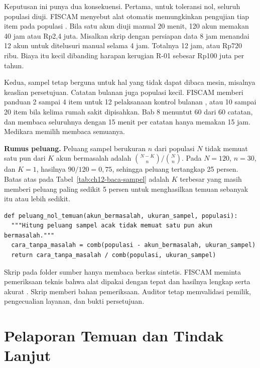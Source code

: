 Keputusan ini punya dua konsekuensi. Pertama, untuk toleransi nol, seluruh populasi diuji. FISCAM
menyebut alat otomatis memungkinkan pengujian tiap item pada populasi \cite{c12-fiscam2026}. Bila
satu akun diuji manual 20 menit, 120 akun memakan 40 jam atau Rp2,4 juta. Misalkan skrip dengan
persiapan data 8 jam menandai 12 akun untuk ditelusuri manual selama 4 jam. Totalnya 12 jam, atau
Rp720 ribu. Biaya itu kecil dibanding harapan kerugian R-01 sebesar Rp100 juta per tahun.

Kedua, sampel tetap berguna untuk hal yang tidak dapat dibaca mesin, misalnya keaslian persetujuan.
Catatan bulanan juga populasi kecil. FISCAM memberi panduan 2 sampai 4 item untuk 12 pelaksanaan
kontrol bulanan \cite{c12-fiscam2026}, atau 10 sampai 20 item bila kelima rumah sakit dipisahkan.
Bab 8 menuntut 60 dari 60 catatan, dan membaca seluruhnya dengan 15 menit per catatan hanya memakan
15 jam. Medikara memilih membaca semuanya.

\begin{pendalaman}
\textbf{Rumus peluang.} Peluang sampel berukuran $n$ dari populasi $N$ tidak memuat satu pun dari
$K$ akun bermasalah adalah $\binom{N-K}{n} / \binom{N}{n}$. Pada $N = 120$, $n = 30$, dan $K = 1$,
hasilnya $90 / 120 = 0{,}75$, sehingga peluang tertangkap 25 persen. Batas atas pada
Tabel~\ref{tab:ch12-baca-sampel} adalah $K$ terbesar yang masih memberi peluang paling sedikit 5
persen untuk menghasilkan temuan sebanyak itu atau lebih sedikit.
\begin{lstlisting}[basicstyle=\ttfamily\scriptsize,columns=fullflexible,frame=lines,breaklines=true,
  caption={Peluang sampel tanpa temuan, tersedia di \berkas{sources/chapter12/uji_sampel_ac01.py}},
  label={lst:ch12-peluang}]
def peluang_nol_temuan(akun_bermasalah, ukuran_sampel, populasi):
  """Hitung peluang sampel acak tidak memuat satu pun akun bermasalah."""
  cara_tanpa_masalah = comb(populasi - akun_bermasalah, ukuran_sampel)
  return cara_tanpa_masalah / comb(populasi, ukuran_sampel)
\end{lstlisting}
Skrip pada folder sumber hanya membaca berkas sintetis. FISCAM meminta pemeriksaan teknis bahwa alat
dipakai dengan tepat dan hasilnya lengkap serta akurat \cite{c12-fiscam2026}. Skrip memberi bahan
pemeriksaan. Auditor tetap memvalidasi pemilik, pengecualian layanan, dan bukti persetujuan.
\end{pendalaman}

\section{Pelaporan Temuan dan Tindak Lanjut}

